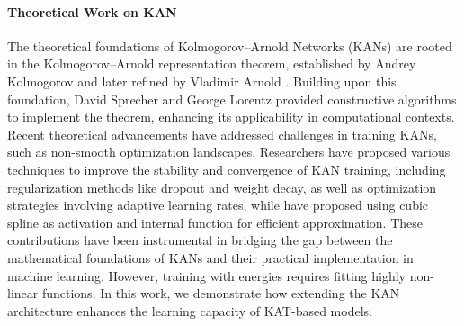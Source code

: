\paragraph{Theoretical Work on KAN}
The theoretical foundations of Kolmogorov–Arnold Networks (KANs) are rooted in the Kolmogorov–Arnold representation theorem, established by Andrey Kolmogorov  \citet{kolmogorov1957representation} and later refined by Vladimir Arnold \citet{arnold1959functions}. 
Building upon this foundation, David Sprecher \citet{sprecher1965structure} and George Lorentz \citet{lorentz1976approximation} provided constructive algorithms to implement the theorem, enhancing its applicability in computational contexts. 
Recent theoretical advancements have addressed challenges in training KANs, such as non-smooth optimization landscapes. Researchers have proposed various techniques to improve the stability and convergence of KAN training, including regularization methods \cite{Braun2009constructive} like dropout and weight decay, as well as optimization strategies involving adaptive learning rates, while \cite{igelnik2003kolmogorov} have proposed using cubic spline as activation and internal function for efficient approximation.  
These contributions have been instrumental in bridging the gap between the mathematical foundations of KANs and their practical implementation in machine learning.
However, training with energies requires fitting highly non-linear functions. In this work, we demonstrate how extending the KAN architecture enhances the learning capacity of KAT-based models.